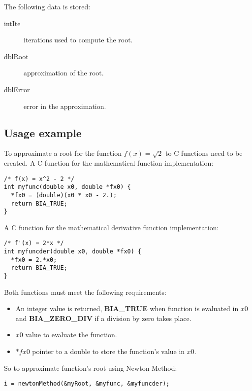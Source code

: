 %
The following data is stored:
%
\begin{description}
\item[intIte] iterations used to compute the root.
\item[dblRoot] approximation of the root.
\item[dblError] error in the approximation.
\end{description}
%

\subsection{Usage example}

To approximate a root for the function $f(x) = \sqrt{2}$ to C functions need to be created. A C function for the mathematical function implementation:
%
\begin{verbatim}
/* f(x) = x^2 - 2 */
int myfunc(double x0, double *fx0) {
  *fx0 = (double)(x0 * x0 - 2.);
  return BIA_TRUE;
}  
\end{verbatim}
%
A C function for the mathematical derivative function implementation:
%
\begin{verbatim}
/* f'(x) = 2*x */
int myfuncder(double x0, double *fx0) {
  *fx0 = 2.*x0;
  return BIA_TRUE;
}  
\end{verbatim}
%
Both functions must meet the following requirements:
%
\begin{itemize}
\item An integer value is returned, \textbf{BIA\_TRUE} when function is evaluated in $x0$ and \textbf{BIA\_ZERO\_DIV} if a division by zero takes place.
\item $x0$ value to evaluate the function.
\item $*fx0$ pointer to a double to store the function's value in $x0$.
\end{itemize}
%
So to approximate function's root using Newton Method:
%
\begin{verbatim}
i = newtonMethod(&myRoot, &myfunc, &myfuncder);  
\end{verbatim}

